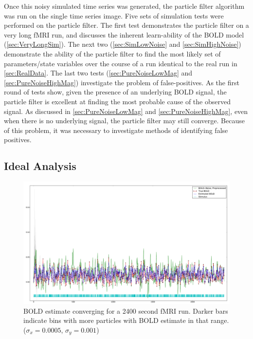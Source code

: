 Once this noisy simulated time series was generated, the particle filter algorithm
was run on the single time series image. Five sets of simulation tests
were performed on the particle filter.
The first test demonstrates the particle filter on a very long \ac{fMRI}
run, and discusses the inherent learn-ability of the \ac{BOLD} model
(\autoref{sec:VeryLongSim}).
The next two (\autoref{sec:SimLowNoise} and \autoref{sec:SimHighNoise})
demonstrate the ability of the particle filter to find the most likely
set of parameters/state variables over the course of a run identical to the
real run in \autoref{sec:RealData}. The last two
tests (\autoref{sec:PureNoiseLowMag} and \autoref{sec:PureNoiseHighMag})
investigate the problem of false-positives. As the first
round of tests show, given the presence of an underlying \ac{BOLD} signal,
the particle filter is excellent at finding the most probable cause of
the observed signal. As discussed in \autoref{sec:PureNoiseLowMag} and
\autoref{sec:PureNoiseHighMag}, even when there is no underlying signal,
the particle filter may still converge. Because of this problem, it was
necessary to investigate methods of identifying false positives.

\subsection{Ideal Analysis}
\label{sec:VeryLongSim}

\begin{figure}
\centering
\includegraphics[clip=true,trim=1cm 0cm 0cm 0cm, width=17cm]{images/long_converge}
\caption[\acs{BOLD} estimate 
converging for a 2400 second \acs{fMRI} run.]{\acs{BOLD} estimate 
converging for a 2400 second \acs{fMRI} run. Darker bars indicate
bins with more particles with \acs{BOLD} estimate in that range. ($\sigma_x = 0.0005$, $\sigma_y = 0.001$)}
\label{fig:long_converge}
\end{figure}

